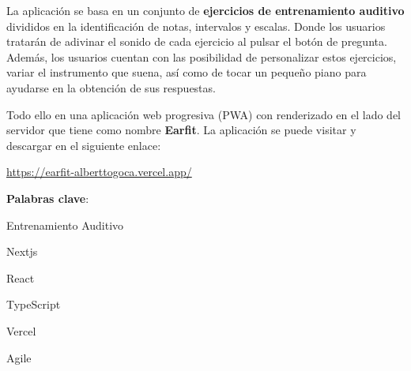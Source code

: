 \documentclass[12pt,twoside,titlepage]{report}
\newcommand\blankpage{%
    \newpage
    \null
    \thispagestyle{empty}%
    \newpage}
\begin{document}
La aplicación se basa en un conjunto de \textbf{ejercicios de entrenamiento auditivo} divididos en la identificación de notas, intervalos y escalas. Donde los usuarios tratarán de adivinar el sonido de cada ejercicio al pulsar el botón de pregunta. Además, los usuarios cuentan con las posibilidad de personalizar estos ejercicios, variar el instrumento que suena, así como de tocar un pequeño piano para ayudarse en la obtención de sus respuestas.

Todo ello en una aplicación web progresiva (PWA) con renderizado en el lado del servidor que tiene como nombre \textbf{Earfit}. La aplicación se puede visitar y descargar en el siguiente enlace:

\url{https://earfit-alberttogoca.vercel.app/}

\mbox{} \bigskip

\noindent \textbf{Palabras clave}:
\begin{compactitem}
    \item Entrenamiento Auditivo
    \item Nextjs
    \item React
    \item TypeScript
    \item Vercel
    \item Agile
\end{compactitem}

\afterpage{\blankpage}


 

\setlength{\parskip}{1pt}
\renewcommand{\baselinestretch}{1}
\renewcommand{\contentsname}{Índice de contenidos}

\tableofcontents
\afterpage{\blankpage}

\listoffigures
\afterpage{\blankpage}


\end{document}
